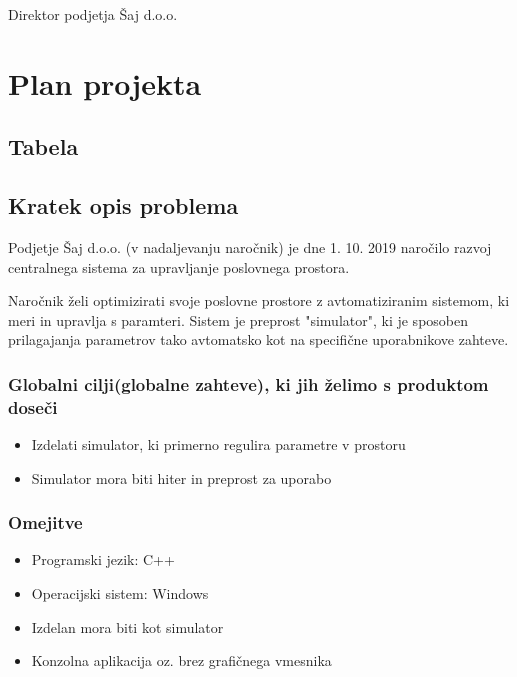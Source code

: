 \documentclass[a4paper,12pt]{article}
\begin{document}
	\hfill Direktor podjetja Šaj d.o.o.	

\newpage

\section{Plan projekta}

	\subsection{Tabela}

	\subsection{Kratek opis problema}

		\hspace{1em} Podjetje Šaj d.o.o. (v nadaljevanju naročnik) je dne 1. 10. 2019 naročilo 
		razvoj centralnega sistema za upravljanje poslovnega prostora.
		
		Naročnik želi optimizirati svoje poslovne prostore z avtomatiziranim sistemom, 
		ki meri in upravlja s paramteri. Sistem je preprost "simulator", ki je sposoben 
		prilagajanja parametrov tako avtomatsko kot na specifične uporabnikove zahteve.
		\subsubsection{Globalni cilji(globalne zahteve), ki jih želimo s produktom doseči}

		\begin{itemize}
			\item Izdelati simulator, ki primerno regulira parametre v prostoru
			\item Simulator mora biti hiter in preprost za uporabo
		\end{itemize}

		\subsubsection{Omejitve}

				\begin{itemize}
					\item Programski jezik: C++
					\item Operacijski sistem: Windows
					\item Izdelan mora biti kot simulator
					\item Konzolna aplikacija oz. brez grafičnega vmesnika
				\end{itemize}
\end{document}
